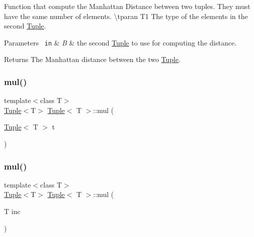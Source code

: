 Function that compute the Manhattan Distance between two tuples. They must have the same number of elements. \textbackslash{}tparan T1 The type of the elements in the second \mbox{\hyperlink{class_tuple}{Tuple}}. 


\begin{DoxyParams}[1]{Parameters}
\mbox{\texttt{ in}}  & {\em B} & the second \mbox{\hyperlink{class_tuple}{Tuple}} to use for computing the distance. \\
\hline
\end{DoxyParams}
\begin{DoxyReturn}{Returns}
The Manhattan distance between the two \mbox{\hyperlink{class_tuple}{Tuple}}. 
\end{DoxyReturn}
\mbox{\label{class_tuple_aa04cadf68dd3658943db047b6fd500fa}} 
\subsubsection{\texorpdfstring{mul()}{mul()}\hspace{0.1cm}{\footnotesize\ttfamily [1/2]}}
{\footnotesize\ttfamily template$<$class T$>$ \\
\mbox{\hyperlink{class_tuple}{Tuple}}$<$T$>$ \mbox{\hyperlink{class_tuple}{Tuple}}$<$ T $>$\+::mul (\begin{DoxyParamCaption}\item[{\mbox{\hyperlink{class_tuple}{Tuple}}$<$ T $>$}]{t }\end{DoxyParamCaption})\hspace{0.3cm}{\ttfamily [inline]}}

\mbox{\label{class_tuple_ad1de2e1ba86734fb751897138707a603}} 
\subsubsection{\texorpdfstring{mul()}{mul()}\hspace{0.1cm}{\footnotesize\ttfamily [2/2]}}
{\footnotesize\ttfamily template$<$class T$>$ \\
\mbox{\hyperlink{class_tuple}{Tuple}}$<$T$>$ \mbox{\hyperlink{class_tuple}{Tuple}}$<$ T $>$\+::mul (\begin{DoxyParamCaption}\item[{T}]{inc }\end{DoxyParamCaption})\hspace{0.3cm}{\ttfamily [inline]}}

